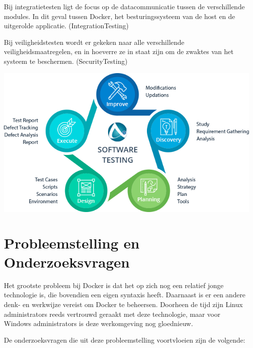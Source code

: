 Bij integratietesten ligt de focus op de datacommunicatie tussen de verschillende modules. In dit geval tussen Docker, het besturingssysteem van de host en de uitgerolde applicatie. (IntegrationTesting)

Bij veiligheidstesten wordt er gekeken naar alle verschillende veiligheidsmaatregelen, en in hoeverre ze in staat zijn om de zwaktes van het systeem te beschermen. (SecurityTesting)

\begin{center}
	\includegraphics[scale=0.5]{img/testingprocess.png}
\end{center}

\section{Probleemstelling en Onderzoeksvragen}
\label{sec:onderzoeksvragen}


Het grootste probleem bij Docker is dat het op zich nog een relatief jonge technologie is, die bovendien een eigen syntaxis heeft. Daarnaast is er een andere denk- en werkwijze vereist om Docker te beheersen. Doorheen de tijd zijn Linux administrators reeds vertrouwd geraakt met deze technologie, maar voor Windows administrators is deze werkomgeving
nog gloednieuw.

De onderzoeksvragen die uit deze probleemstelling voortvloeien zijn de volgende:

